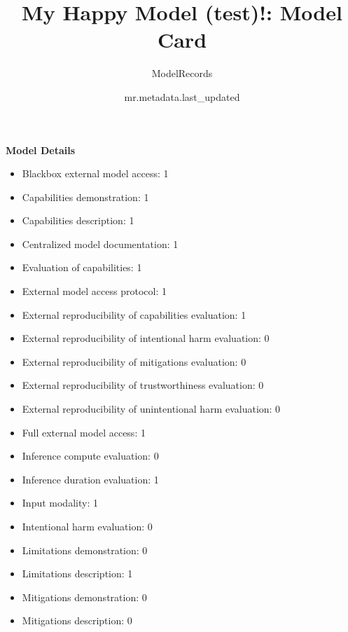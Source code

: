 \documentclass{article}
\title{My Happy Model (test)!: Model Card}
\author{ModelRecords}
\date{mr.metadata.last_updated}
\begin{document}
\newenvironment{mcsection}[1]
    {
        \textbf{#1}


        \begin{itemize}[leftmargin=*,topsep=0pt,itemsep=-1ex,partopsep=1ex,parsep=1ex,after=\vspace{\medskipamount}]
    }
    {
        \end{itemize}
    }

\begin{adjustwidth}{-60pt}{-30pt}
\begin{singlespace}

\begin{tcolorbox}[title=\textbf{My Happy Model (test)! : Model Card},
breakable, sharp corners, boxrule=0.7pt]

\begin{mcsection}{Model Details}
    \item Blackbox external model access: 1
    \item Capabilities demonstration: 1
    \item Capabilities description: 1
    \item Centralized model documentation: 1
    \item Evaluation of capabilities: 1
    \item External model access protocol: 1
    \item External reproducibility of capabilities evaluation: 1
    \item External reproducibility of intentional harm evaluation: 0
    \item External reproducibility of mitigations evaluation: 0
    \item External reproducibility of trustworthiness evaluation: 0
    \item External reproducibility of unintentional harm evaluation: 0
    \item Full external model access: 1
    \item Inference compute evaluation: 0
    \item Inference duration evaluation: 1
    \item Input modality: 1
    \item Intentional harm evaluation: 0
    \item Limitations demonstration: 0
    \item Limitations description: 1
    \item Mitigations demonstration: 0
    \item Mitigations description: 0

\end{mcsection}
\end{tcolorbox}
\end{singlespace}
\end{adjustwidth}
\end{document}
